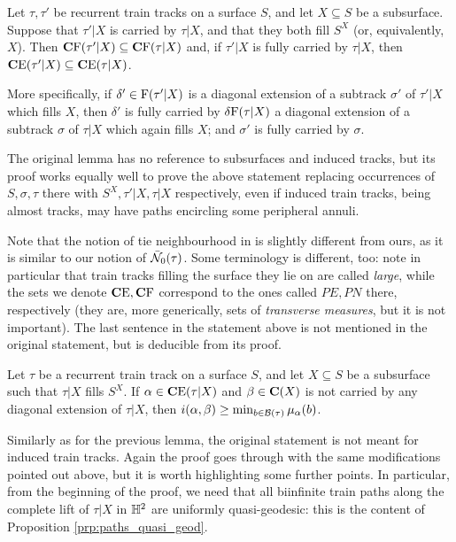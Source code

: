 \begin{lemma}\label{lem:cf_decreasing}
Let $\tau,\tau'$ be recurrent train tracks on a surface $S$, and let $X\subseteq S$ be a subsurface. Suppose that $\tau'|X$ is carried by $\tau|X$, and that they both fill $S^X$ (or, equivalently, $X$). Then $\mathbf C \mathrm F(\tau'|X)\subseteq \mathbf C \mathrm F(\tau|X)$ and, if $\tau'|X$ is fully carried by $\tau|X$, then $\mathbf C \mathrm E(\tau'|X)\subseteq \mathbf C \mathrm E(\tau|X)$.

More specifically, if $\delta'\in \mathrm{F}(\tau'|X)$ is a diagonal extension of a subtrack $\sigma'$ of $\tau'|X$ which fills $X$, then $\delta'$ is fully carried by  $\delta\mathrm{F}(\tau|X)$ a diagonal extension of a subtrack $\sigma$ of $\tau|X$ which again fills $X$; and $\sigma'$ is fully carried by $\sigma$.
\end{lemma}
The original lemma has no reference to subsurfaces and induced tracks, but its proof works equally well to prove the above statement replacing occurrences of $S,\sigma,\tau$ there with $S^X,\tau'|X,\tau|X$ respectively, even if induced train tracks, being almost tracks, may have paths encircling some peripheral annuli.

Note that the notion of tie neighbourhood in \cite{masurminskyi} is slightly different from ours, as it is similar to our notion of $\bar{{\mathcal N}}_0(\tau)$. Some terminology is different, too: note in particular that train tracks filling the surface they lie on are called \emph{large}, while the sets we denote $\mathbf C \mathrm E,\mathbf C \mathrm F$ correspond to the ones called $PE,PN$ there, respectively (they are, more generically, sets of \emph{transverse measures}, but it is not important). The last sentence in the statement above is not mentioned in the original statement, but is deducible from its proof.

\begin{lemma}\label{lem:diag_inters_control}
Let $\tau$ be a recurrent train track on a surface $S$, and let $X\subseteq S$ be a subsurface such that $\tau|X$ fills $S^X$. If $\alpha\in\mathbf C \mathrm E(\tau|X)$ and $\beta\in\mathbf C(X)$ is not carried by any diagonal extension of $\tau|X$, then $i(\alpha,\beta)\geq \min_{b\in\mathcal B(\tau)}\mu_\alpha(b)$.
\end{lemma}
Similarly as for the previous lemma, the original statement is not meant for induced train tracks. Again the proof goes through with the same modifications pointed out above, but it is worth highlighting some further points. In particular, from the beginning of the proof, we need that all biinfinite train paths along the complete lift of $\tau|X$ in $\mathbb H^2$ are uniformly quasi-geodesic: this is the content of Proposition \ref{prp:paths_quasi_geod}.

